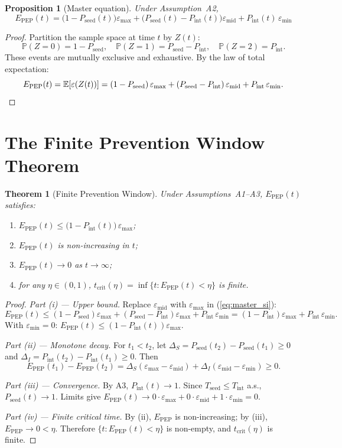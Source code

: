 \documentclass[11pt]{article}
\newtheorem{theorem}{Theorem}[section]
\newtheorem{proposition}{Proposition}[section]
\theoremstyle{definition}
\theoremstyle{remark}
\newcommand{\Tseed}{T_{\text{seed}}}
\newcommand{\Tint}{T_{\text{int}}}
\newcommand{\Pseed}{P_{\text{seed}}}
\newcommand{\Pint}{P_{\text{int}}}
\newcommand{\Epep}{E_{\text{PEP}}}
\newcommand{\tcrit}{t_{\text{crit}}}
\newcommand{\emax}{\varepsilon_{\max}}
\newcommand{\emid}{\varepsilon_{\text{mid}}}
\newcommand{\emin}{\varepsilon_{\min}}
\begin{document}
\begin{proposition}[Master equation]\label{prop:master}
Under Assumption~A2,
\begin{equation}
\Epep(t) = \big(1 - \Pseed(t)\big)\emax + \big(\Pseed(t) - \Pint(t)\big)\emid + \Pint(t)\,\emin
\label{eq:master_si}
\end{equation}
\end{proposition}

\begin{proof}
Partition the sample space at time $t$ by $Z(t)$:
\[
\mathbb{P}(Z = 0) = 1 - \Pseed,\quad
\mathbb{P}(Z = 1) = \Pseed - \Pint,\quad
\mathbb{P}(Z = 2) = \Pint.
\]
These events are mutually exclusive and exhaustive. By the law of total expectation:
\[
\Epep(t) = \mathbb{E}[\varepsilon(Z(t))] = (1 - \Pseed)\,\emax + (\Pseed - \Pint)\,\emid + \Pint\,\emin. \qedhere
\]
\end{proof}

\section{The Finite Prevention Window Theorem}

\begin{theorem}[Finite Prevention Window]\label{thm:finite}
Under Assumptions~A1--A3, $\Epep(t)$ satisfies:
\begin{enumerate}[label=\textnormal{(\roman*)},leftmargin=2.5em]
    \item $\Epep(t) \leq \big(1 - \Pint(t)\big)\,\emax$;
    \item $\Epep(t)$ is non-increasing in $t$;
    \item $\Epep(t) \to 0$ as $t \to \infty$;
    \item for any $\eta \in (0,1)$, $\tcrit(\eta) = \inf\{t : \Epep(t) < \eta\}$ is finite.
\end{enumerate}
\end{theorem}

\begin{proof}
\textit{Part (i) --- Upper bound.} Replace $\emid$ with $\emax$ in (\ref{eq:master_si}):
\[
\Epep(t) \leq (1 - \Pseed)\emax + (\Pseed - \Pint)\emax + \Pint\,\emin = (1 - \Pint)\emax + \Pint\,\emin.
\]
With $\emin = 0$: $\Epep(t) \leq (1 - \Pint(t))\emax$.

\textit{Part (ii) --- Monotone decay.} For $t_{1} < t_{2}$, let $\Delta_{S} = \Pseed(t_{2}) - \Pseed(t_{1}) \geq 0$ and $\Delta_{I} = \Pint(t_{2}) - \Pint(t_{1}) \geq 0$. Then
\[
\Epep(t_{1}) - \Epep(t_{2}) = \Delta_{S}(\emax - \emid) + \Delta_{I}(\emid - \emin) \geq 0.
\]

\textit{Part (iii) --- Convergence.} By A3, $\Pint(t) \to 1$. Since $\Tseed \leq \Tint$ a.s., $\Pseed(t) \to 1$. Limits give $\Epep(t) \to 0\cdot\emax + 0\cdot\emid + 1\cdot\emin = 0$.

\textit{Part (iv) --- Finite critical time.} By (ii), $\Epep$ is non-increasing; by (iii), $\Epep \to 0 < \eta$. Therefore $\{t : \Epep(t) < \eta\}$ is non-empty, and $\tcrit(\eta)$ is finite.
\end{proof}
\end{document}
